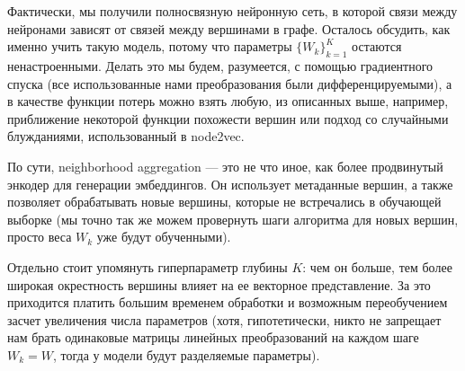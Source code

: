 \documentclass[12pt,a4paper]{article}
\begin{document}
\begin{figure}[H]
\end{figure}

Фактически, мы получили полносвязную нейронную сеть, в которой связи между нейронами зависят от связей между вершинами в графе. Осталось обсудить, как именно учить такую модель, потому что параметры $\{W_k\}_{k=1}^K$ остаются ненастроенными. Делать это мы будем, разумеется, с помощью градиентного спуска (все использованные нами преобразования были дифференцируемыми), а в качестве функции потерь можно взять любую, из описанных выше, например, приближение некоторой функции похожести вершин или подход со случайными блужданиями, использованный в node2vec.

По сути, neighborhood aggregation --- это не что иное, как более продвинутый энкодер для генерации эмбеддингов. Он использует метаданные вершин, а также позволяет обрабатывать новые вершины, которые не встречались в обучающей выборке (мы точно так же можем провернуть шаги алгоритма для новых вершин, просто веса $W_k$ уже будут обученными).

Отдельно стоит упомянуть гиперпараметр глубины $K$: чем он больше, тем более широкая окрестность вершины влияет на ее векторное представление. За это приходится платить большим временем обработки и возможным переобучением засчет увеличения числа параметров (хотя, гипотетически, никто не запрещает нам брать одинаковые матрицы линейных преобразований на каждом шаге $W_k = W$, тогда у модели будут разделяемые параметры).
\end{document}
